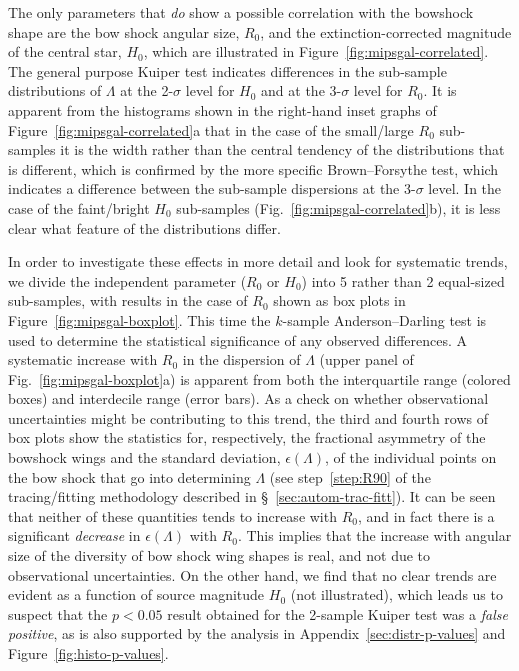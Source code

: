 \documentclass[useAMS, usenatbib, a4paper]{mnras}
\begin{document}
The only parameters that \emph{do} show a possible correlation with
the bowshock shape are the bow shock angular size, \(R_0\), and the
extinction-corrected magnitude of the central star, \(H_0\), which are
illustrated in Figure~\ref{fig:mipsgal-correlated}.  The general
purpose Kuiper test indicates differences in the sub-sample
distributions of \(\Lambda\) at the 2-\(\sigma\) level for \(H_0\) and at the
3-\(\sigma\) level for \(R_0\).  It is apparent from the histograms shown
in the right-hand inset graphs of Figure~\ref{fig:mipsgal-correlated}a
that in the case of the small/large \(R_0\) sub-samples it is the
width rather than the central tendency of the distributions that is
different, which is confirmed by the more specific Brown--Forsythe
test, which indicates a difference between the sub-sample dispersions
at the 3-\(\sigma\) level.  In the case of the faint/bright \(H_0\)
sub-samples (Fig.~\ref{fig:mipsgal-correlated}b), it is less clear
what feature of the distributions differ.

In order to investigate these effects in more detail and look for
systematic trends, we divide the independent parameter (\(R_0\) or
\(H_0\)) into 5 rather than 2 equal-sized sub-samples, with results in
the case of \(R_0\) shown as box plots in
Figure~\ref{fig:mipsgal-boxplot}.  This time the \(k\)-sample
Anderson--Darling test \citep{Anderson:1952a, Scholz:1987a,
  Makarov:2017a} is used to determine the statistical significance of
any observed differences.  A systematic increase with \(R_0\) in the
dispersion of \(\Lambda\) (upper panel of Fig.~\ref{fig:mipsgal-boxplot}a)
is apparent from both the interquartile range (colored boxes) and
interdecile range (error bars).  As a check on whether observational
uncertainties might be contributing to this trend, the third and
fourth rows of box plots show the statistics for, respectively, the
fractional asymmetry of the bowshock wings and the standard deviation,
\(\epsilon(\Lambda)\), of the individual points on the bow shock that go into
determining \(\Lambda\) (see step~\ref{step:R90} of the tracing/fitting
methodology described in \S~\ref{sec:autom-trac-fitt}).  It can be
seen that neither of these quantities tends to increase with \(R_0\),
and in fact there is a significant \emph{decrease} in
\(\epsilon(\Lambda)\) with \(R_0\).  This implies that the increase with angular
size of the diversity of bow shock wing shapes is real, and not due to
observational uncertainties.  On the other hand, we find that no clear
trends are evident as a function of source magnitude \(H_0\) (not
illustrated), which leads us to suspect that the \(p < 0.05\) result
obtained for the 2-sample Kuiper test was a \emph{false positive}, as
is also supported by the analysis in Appendix~\ref{sec:distr-p-values}
and Figure~\ref{fig:histo-p-values}.
\end{document}
